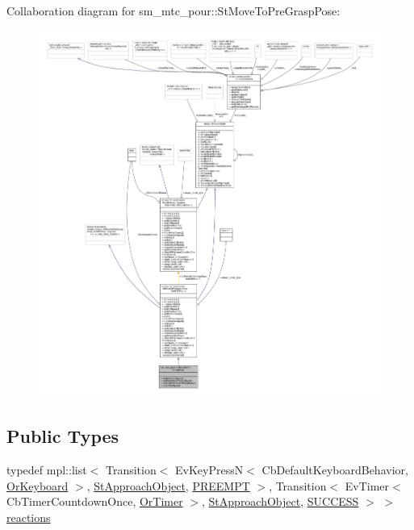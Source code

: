 Collaboration diagram for sm\+\_\+mtc\+\_\+pour\+:\+:St\+Move\+To\+Pre\+Grasp\+Pose\+:
\nopagebreak
\begin{figure}[H]
\begin{center}
\leavevmode
\includegraphics[width=350pt]{structsm__mtc__pour_1_1StMoveToPreGraspPose__coll__graph}
\end{center}
\end{figure}
\subsection*{Public Types}
\begin{DoxyCompactItemize}
\item 
typedef mpl\+::list$<$ Transition$<$ Ev\+Key\+PressN$<$ Cb\+Default\+Keyboard\+Behavior, \hyperlink{classsm__mtc__pour_1_1OrKeyboard}{Or\+Keyboard} $>$, \hyperlink{structsm__mtc__pour_1_1StApproachObject}{St\+Approach\+Object}, \hyperlink{classPREEMPT}{P\+R\+E\+E\+M\+PT} $>$, Transition$<$ Ev\+Timer$<$ Cb\+Timer\+Countdown\+Once, \hyperlink{classsm__mtc__pour_1_1OrTimer}{Or\+Timer} $>$, \hyperlink{structsm__mtc__pour_1_1StApproachObject}{St\+Approach\+Object}, \hyperlink{classSUCCESS}{S\+U\+C\+C\+E\+SS} $>$ $>$ \hyperlink{structsm__mtc__pour_1_1StMoveToPreGraspPose_a0bf563260ac3d6ece8442e792bd062da}{reactions}
\end{DoxyCompactItemize}
